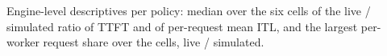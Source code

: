 \begin{table}[tbp]
  \centering
  \caption{Engine-level descriptives per policy: median over the six cells of the live / simulated
    ratio of TTFT and of per-request mean ITL, and the largest per-worker request share over the
    cells, live / simulated.}
  \label{tab:live-engine}
  
\end{table}
